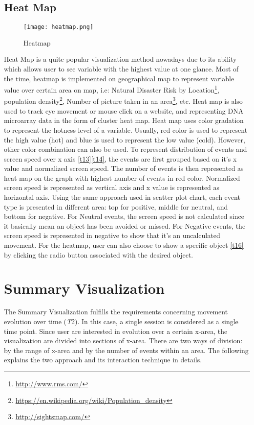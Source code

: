 \subsection{Heat Map}
\begin{figure}
\centering
\texttt{[image: heatmap.png]}
\caption{Heatmap}
\end{figure}
Heat Map is a quite popular visualization method nowadays due to its ability which allows user to see variable with the highest value at one glance. Most of the time, heatmap is implemented on geographical map to represent variable value over certain area on map, i.e: Natural Disaster Risk by Location\footnote{\url{http://www.rms.com/}}, population density\footnote{\url{https://en.wikipedia.org/wiki/Population_density}}, Number of picture taken in an area\footnote{\url{http://sightsmap.com/}}, etc. Heat map is also used to track eye movement or mouse click on a website, and representing DNA microarray data in the form of cluster heat map\cite{friendly}. Heat map uses color gradation to represent the hotness level of a variable. Usually, red color is used to represent the high value (hot) and blue is used to represent the low value (cold). However, other color combination can also be used. To represent distribution of events and screen speed over x axis \ref{t13}\ref{t14}, the events are first grouped based on it's x value and normalized screen speed. The number of events is then represented as heat map on the graph with highest number of events in red color. Normalized screen speed is represented as vertical axis and x value is represented as horizontal axis. Using the same approach used in scatter plot chart, each event type is presented in different area: top for positive, middle for neutral, and bottom for negative. For Neutral events, the screen speed is not calculated since it basically mean an object has been avoided or missed. For Negative events, the screen speed is represented in negative to show that it's an uncalculated movement. For the heatmap, user can also choose to show a specific object \ref{t16} by clicking the radio button associated with the desired object.

\section{Summary Visualization}
The Summary Visualization fulfills the requirements concerning movement evolution over time (\textit{T}2). In this case, a single session is considered as a single time point. Since user are interested in evolution over a certain x-area, the visualization are divided into sections of x-area. There are two ways of division: by the range of x-area and by the number of events within an area. The following explains the two approach and its interaction technique in details.

